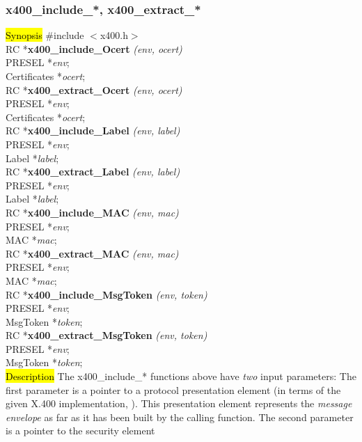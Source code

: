 \subsubsection{x400\_include\_*, x400\_extract\_*}
\label{x4_in_ex}
\hl{Synopsis}
\#include $<$x400.h$>$ \\ [1ex]
RC *{\bf x400\_include\_Ocert} {\em (env, ocert)} \\
PRESEL *{\em env}; \\
Certificates *{\em ocert}; \\ [1ex]
RC *{\bf x400\_extract\_Ocert} {\em (env, ocert)} \\
PRESEL *{\em env}; \\
Certificates *{\em ocert}; \\ [1ex]
RC *{\bf x400\_include\_Label} {\em (env, label)} \\
PRESEL *{\em env}; \\
Label *{\em label}; \\ [1ex]
RC *{\bf x400\_extract\_Label} {\em (env, label)} \\
PRESEL *{\em env}; \\
Label *{\em label}; \\ [1ex]
RC *{\bf x400\_include\_MAC} {\em (env, mac)} \\
PRESEL *{\em env}; \\
MAC *{\em mac}; \\ [1ex]
RC *{\bf x400\_extract\_MAC} {\em (env, mac)} \\
PRESEL *{\em env}; \\
MAC *{\em mac}; \\ [1ex]
RC *{\bf x400\_include\_MsgToken} {\em (env, token)} \\
PRESEL *{\em env}; \\
MsgToken *{\em token}; \\ [1ex]
RC *{\bf x400\_extract\_MsgToken} {\em (env, token)} \\
PRESEL *{\em env}; \\
MsgToken *{\em token}; \\
\hl{Description}
The x400\_include\_* functions above
have {\em two} input parameters:
The first parameter is a pointer to a protocol presentation element
(in terms of the given X.400 implementation,
).
This presentation element
represents the {\em message envelope}
as far as it has been built by the calling function.
The second parameter is a pointer to the security element
